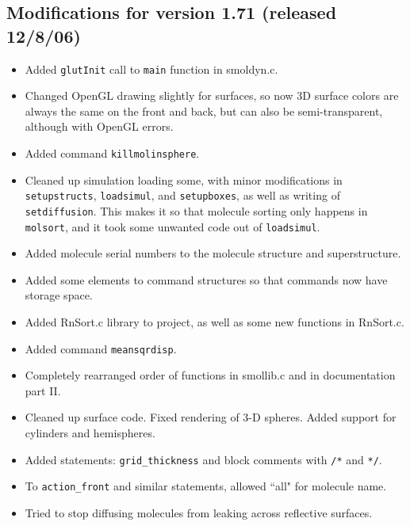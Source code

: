 \documentclass {scrbook}
\newcommand {\ttt} {\texttt}
\begin{document}
\subsection{Modifications for version 1.71 (released 12/8/06)}
\begin{itemize}
\item Added \ttt{glutInit} call to \ttt{main} function in smoldyn.c.
\item Changed OpenGL drawing slightly for surfaces, so now 3D surface colors are always the same on the front and back, but can also be semi-transparent, although with OpenGL errors.
\item Added command \ttt{killmolinsphere}.
\item Cleaned up simulation loading some, with minor modifications in \ttt{setupstructs}, \ttt{loadsimul}, and \ttt{setupboxes}, as well as writing of \ttt{setdiffusion}. This makes it so that molecule sorting only happens in \ttt{molsort}, and it took some unwanted code out of \ttt{loadsimul}.
\item Added molecule serial numbers to the molecule structure and superstructure.
\item Added some elements to command structures so that commands now have storage space.
\item Added RnSort.c library to project, as well as some new functions in RnSort.c.
\item Added command \ttt{meansqrdisp}.
\item Completely rearranged order of functions in smollib.c and in documentation part II.
\item Cleaned up surface code. Fixed rendering of 3-D spheres. Added support for cylinders and hemispheres.
\item Added statements: \ttt{grid\_thickness} and block comments with \ttt{/*} and \ttt{*/}.
\item To \ttt{action\_front} and similar statements, allowed ``all" for molecule name.
\item Tried to stop diffusing molecules from leaking across reflective surfaces.
\end{itemize}
\end{document}
